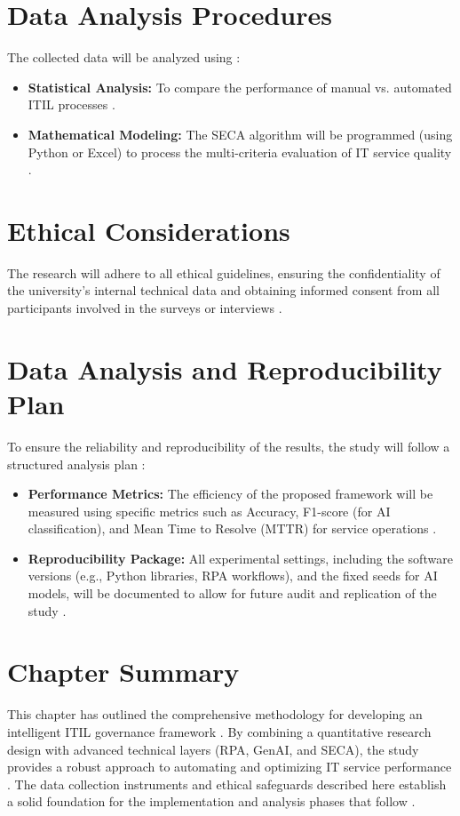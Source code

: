 \documentclass[12pt,a4paper,oneside]{report}
\begin{document}
\section{Data Analysis Procedures}
The collected data will be analyzed using \cite{almontaser2025}:
\begin{itemize}
    \item \textbf{Statistical Analysis:} To compare the performance of manual vs. automated ITIL processes \cite{almontaser2025}.
    \item \textbf{Mathematical Modeling:} The SECA algorithm will be programmed (using Python or Excel) to process the multi-criteria evaluation of IT service quality \cite{almontaser2025}.
\end{itemize}

\section{Ethical Considerations}
The research will adhere to all ethical guidelines, ensuring the confidentiality of the university’s internal technical data and obtaining informed consent from all participants involved in the surveys or interviews \cite{almontaser2025}.

\section{Data Analysis and Reproducibility Plan}
To ensure the reliability and reproducibility of the results, the study will follow a structured analysis plan \cite{almontaser2025}:
\begin{itemize}
    \item \textbf{Performance Metrics:} The efficiency of the proposed framework will be measured using specific metrics such as Accuracy, F1-score (for AI classification), and Mean Time to Resolve (MTTR) for service operations \cite{almontaser2025}.
    \item \textbf{Reproducibility Package:} All experimental settings, including the software versions (e.g., Python libraries, RPA workflows), and the fixed seeds for AI models, will be documented to allow for future audit and replication of the study \cite{almontaser2025}.
\end{itemize}

\section{Chapter Summary}
This chapter has outlined the comprehensive methodology for developing an intelligent ITIL governance framework \cite{almontaser2025}. By combining a quantitative research design with advanced technical layers (RPA, GenAI, and SECA), the study provides a robust approach to automating and optimizing IT service performance \cite{almontaser2025}. The data collection instruments and ethical safeguards described here establish a solid foundation for the implementation and analysis phases that follow \cite{almontaser2025}.
\end{document}
